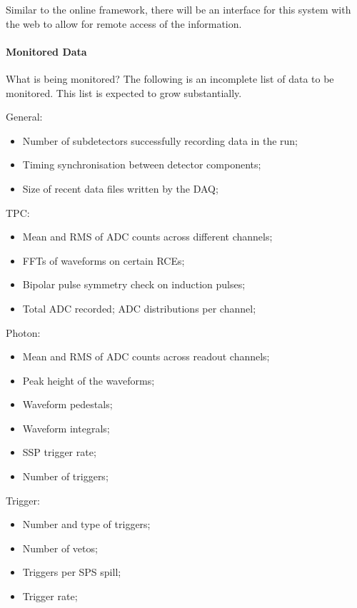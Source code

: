 Similar to the online framework, there will be an interface for this system
with the web to allow for remote access of the information.

\paragraph{Monitored Data}

What is being monitored?  The following is an incomplete list of data to be 
monitored.  This list is expected to grow substantially.

General:
\begin{itemize}
\item{Number of subdetectors successfully recording data in the run;}
\item{Timing synchronisation between detector components;}
\item{Size of recent data files written by the DAQ;}
\end{itemize}
  TPC:
\begin{itemize}
\item{Mean and RMS of ADC counts across different channels;}
\item{FFTs of waveforms on certain RCEs;}
\item{Bipolar pulse symmetry check on induction pulses;}
\item{Total ADC recorded; ADC distributions per channel;}
\end{itemize}
  Photon:
\begin{itemize}
\item{Mean and RMS of ADC counts across readout channels;}
\item{Peak height of the waveforms;}
\item{Waveform pedestals;}
\item{Waveform integrals;}
\item{SSP trigger rate;}
\item{Number of triggers;}
\end{itemize}
  Trigger:
\begin{itemize}
\item{Number and type of triggers;}
\item{Number of vetos;}
\item{Triggers per SPS spill;}
\item{Trigger rate;}
\end{itemize}


